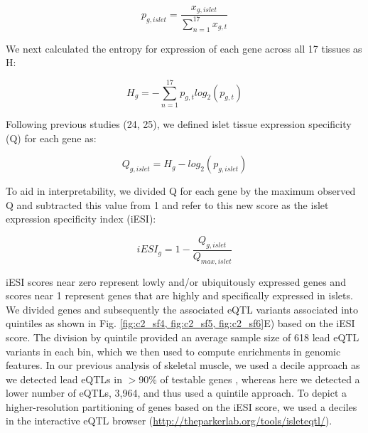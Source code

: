 \[ p_{g,islet} = \frac{x_{g,islet}}{\sum_{n=1}^{17}x_{g,t}}  \]

We next calculated the entropy for expression of each gene across all 17 tissues as H:

\[ H_g = -\sum_{n=1}^{17}p_{g,t} log_2(p_{g,t}) \]

Following previous studies (24, 25), we defined islet tissue expression specificity (Q) for each gene as:

\[ Q_{g,islet} = H_g - log_2(p_{g,islet}) \]

To aid in interpretability, we divided Q for each gene by the maximum observed Q and subtracted this value from 1 and refer to this new score as the islet expression specificity index (iESI):

\[ iESI_g = 1 - \frac{Q_{g,islet}}{Q_{max,islet}} \]

iESI scores near zero represent lowly and/or ubiquitously expressed genes and scores near 1 represent genes that are highly and specifically expressed in islets. We divided genes and subsequently the associated eQTL variants associated into quintiles as shown in Fig. \ref{fig:c2_sf4, fig:c2_sf5, fig:c2_sf6}E) based on the iESI score. The division by quintile provided an average sample size of 618 lead eQTL variants in each bin, which we then used to compute enrichments in genomic features. In our previous analysis of skeletal muscle, we used a decile approach as we detected lead eQTLs in $>$90\% of testable genes \cite{scottGeneticRegulatorySignature2016}, whereas here we detected a lower number of eQTLs, 3,964, and thus used a quintile approach. To depict a higher-resolution partitioning of genes based on the iESI score, we used a deciles in the interactive eQTL browser (\url{http://theparkerlab.org/tools/isleteqtl/}).

